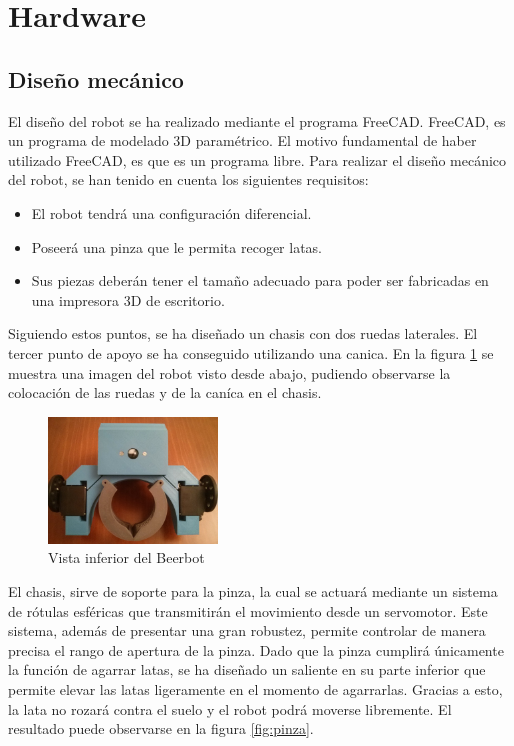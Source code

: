 \section{Hardware}
\label{hardware}


\subsection{Diseño mecánico}

El diseño del robot se ha realizado mediante el programa FreeCAD. FreeCAD, es un programa de modelado 3D paramétrico. El motivo fundamental de haber utilizado FreeCAD, es que es un programa libre. Para realizar el diseño mecánico del robot, se han tenido en cuenta los siguientes requisitos:

\begin{itemize}
	\item El robot tendrá una configuración diferencial.
	\item Poseerá una pinza que le permita recoger latas.
	\item Sus piezas deberán tener el tamaño adecuado para poder ser fabricadas en una impresora 3D de escritorio.
\end{itemize}

Siguiendo estos puntos, se ha diseñado un chasis con dos ruedas laterales. El tercer punto de apoyo se ha conseguido utilizando una canica. En la figura \ref{fig:abajo} se muestra una imagen del robot visto desde abajo, pudiendo observarse la colocación de las ruedas y de la caníca en el chasis.

\begin{figure}[H]
        \centering
        \includegraphics[width=0.4\textwidth]{images/abajo.jpg}
        \caption{Vista inferior del Beerbot}
        \label{fig:abajo}
\end{figure} 
El chasis, sirve de soporte para la pinza, la cual se actuará mediante un sistema de rótulas esféricas que transmitirán el movimiento desde un servomotor. Este sistema, además de presentar una gran robustez, permite controlar de manera precisa el rango de apertura de la pinza. Dado que la pinza cumplirá únicamente la función de agarrar latas, se ha diseñado un saliente en su parte inferior que permite elevar las latas ligeramente en el momento de agarrarlas. Gracias a esto, la lata no rozará contra el suelo y el robot podrá moverse libremente. El resultado puede observarse en la figura \ref{fig:pinza}.

